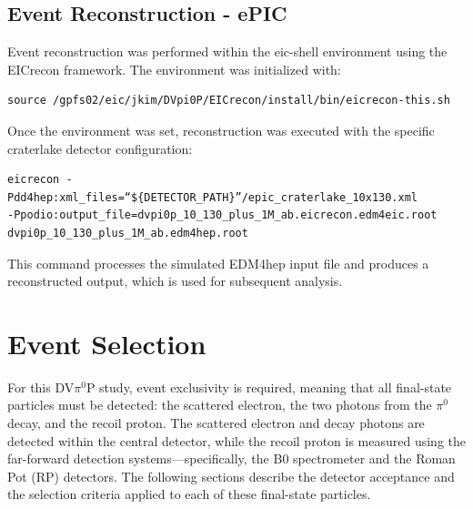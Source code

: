 \documentclass[letterpaper,12pt]{article}
\begin{document}
\subsection{Event Reconstruction - ePIC}\label{subsec:EvRecon}
Event reconstruction was performed within the eic-shell environment using the EICrecon framework. The environment was initialized with:
\begin{verbatim}
source /gpfs02/eic/jkim/DVpi0P/EICrecon/install/bin/eicrecon-this.sh
\end{verbatim}
Once the environment was set, reconstruction was executed with the specific craterlake detector configuration:
\begin{verbatim}
eicrecon -Pdd4hep:xml_files=“${DETECTOR_PATH}”/epic_craterlake_10x130.xml 
-Ppodio:output_file=dvpi0p_10_130_plus_1M_ab.eicrecon.edm4eic.root 
dvpi0p_10_130_plus_1M_ab.edm4hep.root
\end{verbatim}
This command processes the simulated EDM4hep input file and produces a reconstructed output, which is used for subsequent analysis.

\section{Event Selection}\label{sec:EvSelect}
For this DV$\pi^0$P study, event exclusivity is required, meaning that all final-state particles must be detected: the scattered electron, the two photons from the $\pi^0$ decay, and the recoil proton. The scattered electron and decay photons are detected within the central detector, while the recoil proton is measured using the far-forward detection systems—specifically, the B0 spectrometer and the Roman Pot (RP) detectors. The following sections describe the detector acceptance and the selection criteria applied to each of these final-state particles.
\end{document}
